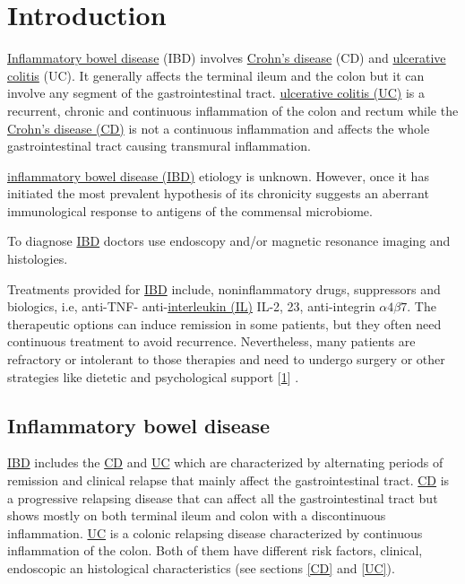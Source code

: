 \documentclass[
  12pt,
  a4paper,
  twoside,
  openright]{book}
\begin{document}
\hypertarget{introduction}{%
\chapter{Introduction}\label{introduction}}

\href{https://en.wikipedia.org/wiki/Inflammatory_bowel_disease}{Inflammatory bowel disease} (IBD) involves \href{https://en.wikipedia.org/wiki/Crohn\%27s_disease}{Crohn's disease} (CD) and \href{https://en.wikipedia.org/wiki/Ulcerative_colitis}{ulcerative colitis} (UC).
It generally affects the terminal ileum and the colon but it can involve any segment of the gastrointestinal tract.
\protect\hyperlink{acronyms_UC}{ulcerative colitis (UC)} is a recurrent, chronic and continuous inflammation of the colon and rectum while the \protect\hyperlink{acronyms_CD}{Crohn's disease (CD)} is not a continuous inflammation and affects the whole gastrointestinal tract causing transmural inflammation.

\protect\hyperlink{acronyms_IBD}{inflammatory bowel disease (IBD)} etiology is unknown.
However, once it has initiated the most prevalent hypothesis of its chronicity suggests an aberrant immunological response to antigens of the commensal microbiome.

To diagnose \protect\hyperlink{acronyms_IBD}{IBD} doctors use endoscopy and/or magnetic resonance imaging and histologies.

Treatments provided for \protect\hyperlink{acronyms_IBD}{IBD} include, noninflammatory drugs, suppressors and biologics, i.e, anti-TNF- anti-\protect\hyperlink{acronyms_IL}{interleukin (IL)} IL-2, 23, anti-integrin \(\alpha4\beta7\).
The therapeutic options can induce remission in some patients, but they often need continuous treatment to avoid recurrence.
Nevertheless, many patients are refractory or intolerant to those therapies and need to undergo surgery or other strategies like dietetic and psychological support {[}\protect\hyperlink{ref-raine2021}{1}{]} .

\hypertarget{IBD}{%
\section{Inflammatory bowel disease}\label{IBD}}

\protect\hyperlink{acronyms_IBD}{IBD} includes the \protect\hyperlink{acronyms_CD}{CD} and \protect\hyperlink{acronyms_UC}{UC} which are characterized by alternating periods of remission and clinical relapse that mainly affect the gastrointestinal tract.
\protect\hyperlink{acronyms_CD}{CD} is a progressive relapsing disease that can affect all the gastrointestinal tract but shows mostly on both terminal ileum and colon with a discontinuous inflammation.
\protect\hyperlink{acronyms_UC}{UC} is a colonic relapsing disease characterized by continuous inflammation of the colon.
Both of them have different risk factors, clinical, endoscopic an histological characteristics (see sections \ref{CD} and \ref{UC}).
\end{document}

